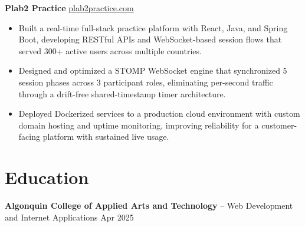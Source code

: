 \documentclass[11pt]{article}       %
\begin{document}
\textbf{Plab2 Practice} \hfill \href{https://plab2practice.com}{plab2practice.com} \\
\vspace{-9pt}
\begin{itemize}
  \item Built a real-time full-stack practice platform with React, Java, and Spring Boot, developing RESTful APIs and WebSocket-based session flows that served 300+ active users across multiple countries.
  \item Designed and optimized a STOMP WebSocket engine that synchronized 5 session phases across 3 participant roles, eliminating per-second traffic through a drift-free shared-timestamp timer architecture.
  \item Deployed Dockerized services to a production cloud environment with custom domain hosting and uptime monitoring, improving reliability for a customer-facing platform with sustained live usage.
\end{itemize}





\section*{Education}
\textbf{Algonquin College of Applied Arts and Technology} -- Web Development and Internet Applications
\hfill Apr 2025 \\
\end{document}
